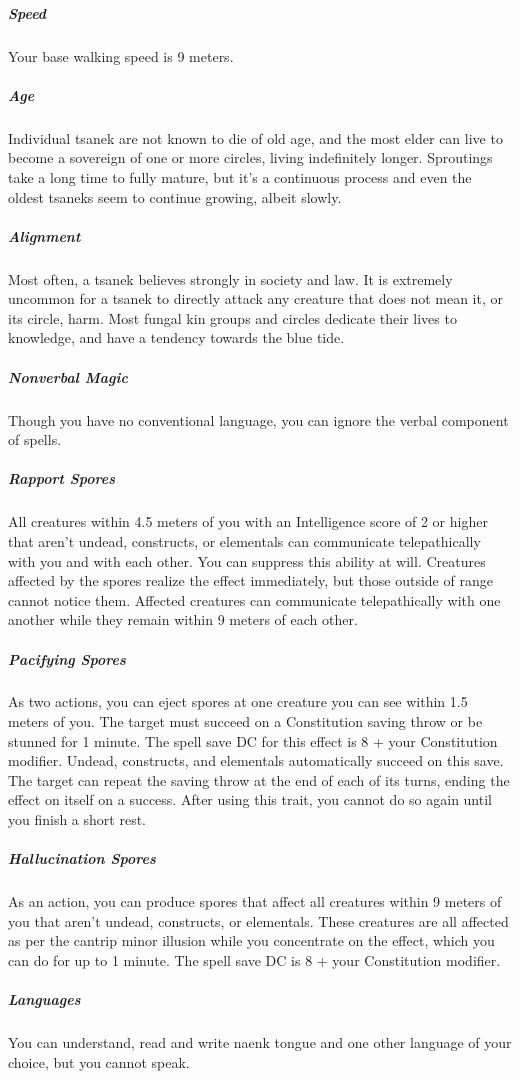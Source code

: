 \begin{linenumbers}
\subparagraph{Speed} Your base walking speed is 9 meters.

\subparagraph{Age} Individual tsanek are not known to die of old age, and the most elder can live to become a sovereign of one or more circles, living indefinitely longer.
Sproutings take a long time to fully mature, but it's a continuous process and even the oldest tsaneks seem to continue growing, albeit slowly.

\subparagraph{Alignment} Most often, a tsanek believes strongly in society and law.
It is extremely uncommon for a tsanek to directly attack any creature that does not mean it, or its circle, harm.
Most fungal kin groups and circles dedicate their lives to knowledge, and have a tendency towards the blue tide.

\subparagraph{Nonverbal Magic} Though you have no conventional language, you can ignore the verbal component of spells.

\subparagraph{Rapport Spores} All creatures within 4.5 meters of you with an Intelligence score of 2 or higher that aren't undead, constructs, or elementals can communicate telepathically with you and with each other.
You can suppress this ability at will.
Creatures affected by the spores realize the effect immediately, but those outside of range cannot notice them.
Affected creatures can communicate telepathically with one another while they remain within 9 meters of each other.

\subparagraph{Pacifying Spores} As two actions, you can eject spores at one creature you can see within 1.5 meters of you.
The target must succeed on a Constitution saving throw or be stunned for 1 minute.
The spell save DC for this effect is 8 + your Constitution modifier.
Undead, constructs, and elementals automatically succeed on this save.
The target can repeat the saving throw at the end of each of its turns, ending the effect on itself on a success.
After using this trait, you cannot do so again until you finish a short rest.

\subparagraph{Hallucination Spores} As an action, you can produce spores that affect all creatures within 9 meters of you that aren't undead, constructs, or elementals.
These creatures are all affected as per the cantrip minor illusion while you concentrate on the effect, which you can do for up to 1 minute.
The spell save DC is 8 + your Constitution modifier.

\subparagraph{Languages} You can understand, read and write naenk tongue and one other language of your choice, but you cannot speak.


\end{linenumbers}
